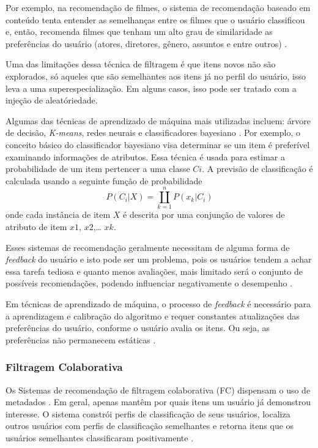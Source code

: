 Por exemplo, na recomendação de filmes, o sistema de recomendação baseado em conteúdo 
tenta entender as semelhanças entre os filmes que o usuário classificou e, então, recomenda filmes 
que tenham um alto grau de similaridade as preferências do usuário (atores, diretores, gênero, assuntos e entre outros) \cite{adomavicius2005}.

Uma das limitações dessa técnica de filtragem é que itens novos não são explorados, só aqueles que são semelhantes 
aos itens já no perfil do usuário, isso leva a uma superespecialização. Em alguns casos, isso pode ser tratado com a 
injeção de aleatóriedade\cite{paulson2003}.


Algumas das técnicas de aprendizado de máquina mais utilizadas incluem: árvore de decisão, \emph{K-means}, redes neurais e classificadores 
bayesiano \cite{son2017}. Por exemplo, o conceito básico do classificador bayesiano visa determinar se um item é preferível examinando informações de 
atributos. Essa técnica é usada para estimar a probabilidade de um item 
pertencer a uma classe $Ci$. A previsão de classificação é calculada usando a 
seguinte função de probabilidade
\begin{equation}
	P(C_{i}|X) = \coprod _{k=1}^{n} P(x_{k}|C_{i})
\end{equation}
onde cada instância de item $X$ é descrita por uma conjunção de valores de atributo de item $x1$, $x2$,… $xk$. 


Esses sistemas de recomendação geralmente necessitam de alguma forma de \emph{feedback} do usuário e isto pode ser 
um problema, pois os usuários tendem a achar essa tarefa tediosa e quanto menos avaliações, mais limitado 
será o conjunto de possíveis recomendações, podendo influenciar negativamente o desempenho \cite{paulson2003}. 

Em técnicas de aprendizado de máquina, o processo de \emph{feedback} é necessário para a aprendizagem e calibração 
do algoritmo e requer constantes atualizações das preferências do usuário, conforme o usuário avalia os itens. Ou seja, 
as preferências não permanecem estáticas \cite{paulson2003}. 



\subsubsection{Filtragem Colaborativa}

Os Sistemas de recomendação de filtragem colaborativa (FC) dispensam o uso de metadados \cite{mauricio}. 
Em geral, apenas mantêm por quais itens um usuário já demonstrou interesse. O sistema constrói perfis de classificação 
de seus usuários, localiza outros usuários com perfis de classificação 
semelhantes e retorna itens que os usuários semelhantes classificaram 
positivamente \cite{son2017}.

